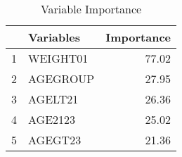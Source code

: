 \begin{table}[ht]
\centering
\begin{tabular}{rlr}
  \toprule
 & Variables & Importance \\ 
  \midrule
1 & WEIGHT01 & 77.02 \\ 
  2 & AGEGROUP & 27.95 \\ 
  3 & AGELT21 & 26.36 \\ 
  4 & AGE2123 & 25.02 \\ 
  5 & AGEGT23 & 21.36 \\ 
   \bottomrule
\end{tabular}
\caption{Variable Importance} 
\end{table}
